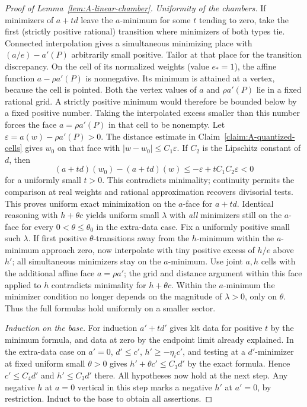 \begin{proof}[Proof of Lemma~\ref{lem:A-linear-chamber}]
\emph{Uniformity of the chambers.}
If minimizers of \(a+t d\) leave the \(a\)-minimum for some \(t\) tending to zero, take the first (strictly positive rational) transition where minimizers of both types tie.
Connected interpolation gives a simultaneous minimizing place with \((a/e)-a'(P)\) arbitrarily small positive.
Tailor at that place for the transition discrepancy.
On the cell of its normalized weights (value \(e_*=1\)), the affine
function \(a-\rho a'(P)\) is nonnegative.  Its minimum is attained at
a vertex, because the cell is pointed.  Both the vertex values of
\(a\) and \(\rho a'(P)\) lie in a fixed rational grid.  A strictly
positive minimum would therefore be bounded below by a fixed positive
number.  Taking the interpolated excess smaller than this number forces
the face \(a=\rho a'(P)\) in that cell to be nonempty.
Let \(\varepsilon=a(w)-\rho a'(P)>0\).
The distance estimate in Claim~\ref{claim:A-quantized-cells}
gives \(w_0\) on that face with
\(\lvert w-w_0\rvert\le C_1\varepsilon\).
If \(C_2\) is the Lipschitz constant of \(d\), then
\[
 (a+td)(w_0)-(a+td)(w)
 \le-\varepsilon+tC_1C_2\varepsilon<0
\]
for a uniformly small \(t>0\).  This contradicts minimality;
continuity permits the comparison at real weights and rational
approximation recovers divisorial tests.
This proves uniform exact minimization on the \(a\)-face for \(a+t d\).
Identical reasoning with \(h+\theta c\) yields uniform small \(\lambda\) with \emph{all} minimizers still on the \(a\)-face for every \(0<\theta\le\theta_0\) in the extra-data case.
Fix a uniformly positive small such \(\lambda\).
If first positive \(\theta\)-transitions away from the \(h\)-minimum within the \(a\)-minimum approach zero, now interpolate with tiny positive excess of \(h/e\) above \(h'\); all simultaneous minimizers stay on the \(a\)-minimum.
Use joint \(a,h\) cells with the additional affine face \(a=\rho a'\); the grid and distance argument within this face applied to \(h\) contradicts minimality for \(h+\theta c\).
Within the \(a\)-minimum the minimizer condition no longer depends on the magnitude of \(\lambda>0\), only on \(\theta\).
Thus the full formulas hold uniformly on a smaller sector.

\emph{Induction on the base.}
For induction \(a'+t d'\) gives klt data for positive \(t\) by the minimum formula, and data at zero by the endpoint limit already explained.
In the extra-data case on \(a'=0\), \(d'\le c'\), \(h'\ge-\eta_i c'\), and testing at a \(d'\)-minimizer at fixed uniform small \(\theta>0\) gives \(h'+\theta c'\le C_3 d'\) by the exact formula.
Hence \(c'\le C_4 d'\) and \(h'\le C_3 d'\) there.
All hypotheses now hold at the next step.
Any negative \(h\) at \(a=0\) vertical in this step marks a negative \(h'\) at \(a'=0\), by restriction.
Induct to the base to obtain all assertions. \end{proof}
